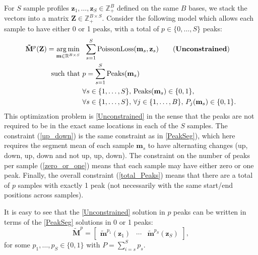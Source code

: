 \documentclass{article} %
\DeclareMathOperator*{\argmin}{arg\,min}
\DeclareMathOperator*{\Peaks}{Peaks}
\newcommand{\RR}{\mathbb R}
\newcommand{\ZZ}{\mathbb Z}
\begin{document}
For $S$ sample profiles $\mathbf z_1, \dots, \mathbf z_S\in\ZZ_+^B$
defined on the same $B$ bases, we stack the vectors into a matrix
$\mathbf Z\in\ZZ_+^{B \times S}$. Consider the following model which
allows each sample to have either 0 or 1 peaks, with a total of
$p\in\{0, \dots, S\}$ peaks:
\begin{align}
  \label{Unconstrained}
  \mathbf{\tilde M}^p(\mathbf Z)  =
  \argmin_{\mathbf m\in\RR^{B\times S}} &\ \ 
  \sum_{s=1}^S 
  \text{PoissonLoss}(\mathbf m_s, \mathbf z_s) 
  \tag{\textbf{Unconstrained}}
  \\
  \text{such that} &\ p = \sum_{s=1}^S \Peaks(\mathbf m_s)
  \label{total_Peaks}
  \\
  &\ \forall s\in\{1, \dots, S\},\, 
  \Peaks(\mathbf m_s)\in\{0, 1\},  
  \label{zero_or_one}
  \\
  &\ \forall s\in\{1, \dots, S\},\, 
  \forall j\in\{1, \dots, B\},\, P_j(\mathbf m_s) \in\{0, 1\}.
  \label{up_down}
\end{align}
This optimization problem is \ref{Unconstrained} in the sense that the
peaks are not required to be in the exact same locations in each of
the $S$ samples. The constraint (\ref{up_down}) is the same
constraint as in \ref{PeakSeg}), which here requires the segment mean
of each sample $\mathbf m_s$ to have alternating changes (up, down,
up, down and not up, up, down). The constraint on the number of peaks
per sample (\ref{zero_or_one}) means that each sample may have either
zero or one peak. Finally, the overall constraint (\ref{total_Peaks})
means that there are a total of $p$ samples with exactly 1 peak (not
necessarily with the same start/end positions across samples).

It is easy to see that the \ref{Unconstrained} solution in $p$ peaks
can be written in terms of the \ref{PeakSeg} solutions in 0 or 1 peaks:
\begin{equation}
  \label{eq:unconstrained_PeakSeg}
  \mathbf{\tilde M}^p = \left[
    \begin{array}{ccc}
      \mathbf{\tilde m}^{p_1}(\mathbf z_1) & 
      \cdots &
      \mathbf{\tilde m}^{p_S}(\mathbf z_S) 
    \end{array}
  \right],
\end{equation}
for some $p_1,\dots, p_S\in\{0, 1\}$ with $P=\sum_{i=s}^S p_s$.
\end{document}
